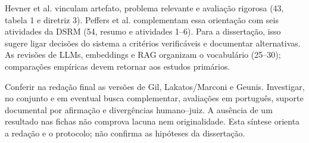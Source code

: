 Hevner et al. vinculam artefato, problema relevante e avaliação rigorosa (43, tabela 1 e diretriz 3). Peffers et al. complementam essa orientação com seis atividades da DSRM (54, resumo e atividades 1–6). Para a dissertação, isso sugere ligar decisões do sistema a critérios verificáveis e documentar alternativas. As revisões de LLMs, embeddings e RAG organizam o vocabulário (25–30); comparações empíricas devem retornar aos estudos primários.

Conferir na redação final as versões de Gil, Lakatos/Marconi e Geunis. Investigar, no conjunto e em eventual busca complementar, avaliações em português, suporte documental por afirmação e divergências humano–juiz. A ausência de um resultado nas fichas não comprova lacuna nem originalidade. Esta síntese orienta a redação e o protocolo; não confirma as hipóteses da dissertação.
